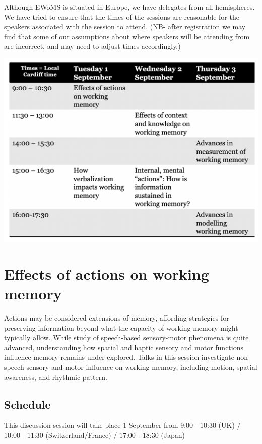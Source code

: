 \documentclass[12pt,]{book}
\begin{document}
Although EWoMS is situated in Europe, we have delegates from all hemispheres. We have tried to ensure that the times of the sessions are reasonable for the speakers associated with the session to attend. (NB- after registration we may find that some of our assumptions about where speakers will be attending from are incorrect, and may need to adjust times accordingly.)

\includegraphics{ewomsSchedule.png}

\hypertarget{effects-of-actions-on-working-memory}{%
\chapter{Effects of actions on working memory}\label{effects-of-actions-on-working-memory}}

Actions may be considered extensions of memory, affording strategies for preserving information beyond what the capacity of working memory might typically allow. While study of speech-based sensory-motor phenomena is quite advanced, understanding how spatial and haptic sensory and motor functions influence memory remains under-explored. Talks in this session investigate non-speech sensory and motor influence on working memory, including motion, spatial awareness, and rhythmic pattern.

\hypertarget{schedule}{%
\section{Schedule}\label{schedule}}

This discussion session will take place 1 September from 9:00 - 10:30 (UK) / 10:00 - 11:30 (Switzerland/France) / 17:00 - 18:30 (Japan)
\end{document}
